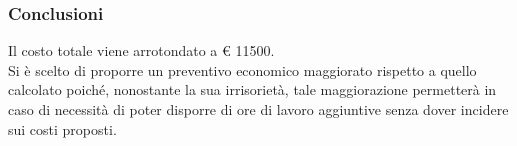 		\subsubsection{Conclusioni}
		Il costo totale viene arrotondato a € 11500. \\
		Si è scelto di proporre un preventivo economico maggiorato rispetto a quello calcolato poiché, nonostante la sua irrisorietà, tale maggiorazione permetterà in caso di necessità di poter disporre di ore di lavoro aggiuntive senza dover incidere sui costi proposti.